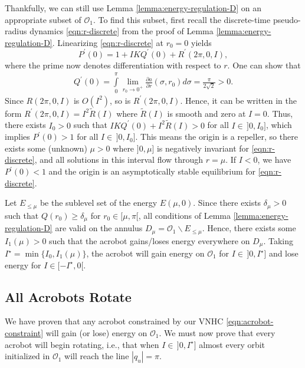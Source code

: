 \documentclass[journal,twoside,web, twocolumn,draftcls]{ieeecolor}
\newcommand*{\pdiff}[2]{\frac{\partial #1}{\partial #2}}
\begin{document}
Thankfully, we can still use Lemma \ref{lemma:energy-regulation-D} on an
appropriate subset of \(\mathcal{O}_1\).
To find this subset, first recall the discrete-time pseudo-radius dynamics
\eqref{eqn:r-discrete} from the proof of Lemma \ref{lemma:energy-regulation-D}.
Linearizing \eqref{eqn:r-discrete} at \(r_0 = 0\) yields
\[
    P^\prime(0) = 1 + I K Q^\prime(0) + R^\prime(2\pi,0,I)
    ,
\]
where the prime now denotes differentiation with respect to \(r\).
One can show that
\begin{align*}
    Q^\prime(0) = \int \limits_0^\pi 
    \lim \limits_{r_0 \to 0^+}\pdiff{a}{r}(\sigma,r_0) d\sigma
    = \frac{\pi}{2\sqrt{2}} > 0
    .
\end{align*}
Since \(R(2\pi,0,I)\) is \(O(I^2)\), so is
\(R^\prime(2\pi,0,I)\).
Hence, it can be written in the form
\(R^\prime(2\pi,0,I) = I^2 \tilde{R}(I)\) where \(\tilde{R}(I)\) is smooth and
zero at \(I = 0\).
Thus, there exists \(I_0 > 0\) such that 
\(I K Q^\prime(0) + I^2 \tilde{R}(I) > 0\) for all \(I \in \, ]0,I_0]\),
which implies \(P^\prime(0) > 1\) for all \(I \in \, ]0,I_0]\).
This means the origin is a repeller, so there exists some
(unknown) \(\mu > 0\) where \(]0,\mu]\) is negatively
invariant for \eqref{eqn:r-discrete}, and all solutions in this
interval flow through \(r = \mu\).
If \(I < 0\), we have \(P^\prime(0) < 1\) and the origin is an
asymptotically stable equilibrium for \eqref{eqn:r-discrete}.

Let \(E_{\leq\mu}\) be the sublevel set of the energy \(E(\mu,0)\).
Since there exists \(\delta_\mu > 0\) such that \(Q(r_0) \geq \delta_\mu\) 
for \(r_0 \in [\mu,\pi[\), all conditions of Lemma
\ref{lemma:energy-regulation-D} are valid on the annulus
\(D_\mu = \mathcal{O}_1 \backslash E_{\leq\mu}\). 
Hence, there exists some \(I_1(\mu) > 0\) such that the acrobot gains/loses
energy everywhere on \(D_\mu\).
Taking \(I^\star = \min\{I_0,I_1(\mu)\}\), the acrobot will gain energy on
\(\mathcal{O}_1\) for \(I \in \, ]0,I^\star]\) and lose energy 
for \(I \in [-I^\star,0[\).

\subsection{All Acrobots Rotate}

We have proven that any acrobot constrained by 
our VNHC \eqref{eqn:acrobot-constraint} will gain (or lose) energy on
\(\mathcal{O}_1\).
We must now prove that every acrobot will begin rotating, 
i.e., that when \(I \in \, ]0,I^\star]\) almost every orbit initialized in
\(\mathcal{O}_1\) will reach the line \(|q_u| = \pi\).
\end{document}
